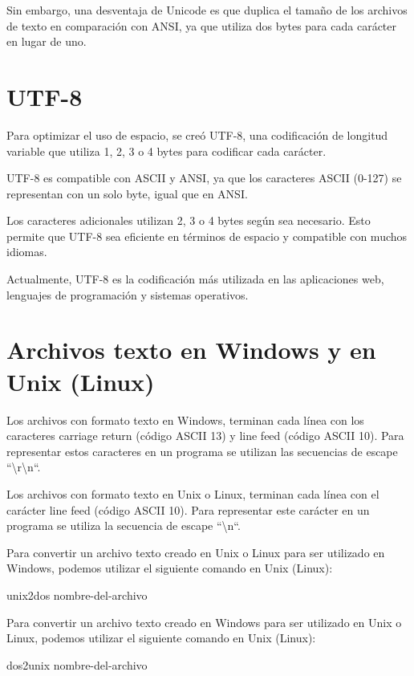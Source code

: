 Sin embargo, una desventaja de Unicode es que duplica el tamaño de los archivos de texto en comparación con ANSI, ya que utiliza dos bytes para cada carácter en lugar de uno.

\section{UTF-8}

Para optimizar el uso de espacio, se creó UTF-8, una codificación de longitud variable que utiliza 1, 2, 3 o 4 bytes para codificar cada carácter.

UTF-8 es compatible con ASCII y ANSI, ya que los caracteres ASCII (0-127) se representan con un solo byte, igual que en ANSI.

Los caracteres adicionales utilizan 2, 3 o 4 bytes según sea necesario. Esto permite que UTF-8 sea eficiente en términos de espacio y compatible con muchos idiomas.

Actualmente, UTF-8 es la codificación más utilizada en las aplicaciones web, lenguajes de programación y sistemas operativos.

\section{Archivos texto en Windows y en Unix (Linux)}

Los archivos con formato texto en Windows, terminan cada línea con los caracteres carriage return (código ASCII 13) y line feed (código ASCII 10). Para representar estos caracteres en un programa se utilizan las secuencias de escape ``\textbackslash{}r\textbackslash{}n``.

Los archivos con formato texto en Unix o Linux, terminan cada línea con el carácter line feed (código ASCII 10). Para representar este carácter en un programa se utiliza la secuencia de escape ``\textbackslash{}n``.

Para convertir un archivo texto creado en Unix o Linux para ser utilizado en Windows, podemos utilizar el siguiente comando en Unix (Linux):

\begin{SourceCode}
unix2dos nombre-del-archivo
\end{SourceCode}

Para convertir un archivo texto creado en Windows para ser utilizado en Unix o Linux, podemos utilizar el siguiente comando en Unix (Linux):

\begin{SourceCode}
dos2unix nombre-del-archivo
\end{SourceCode}

